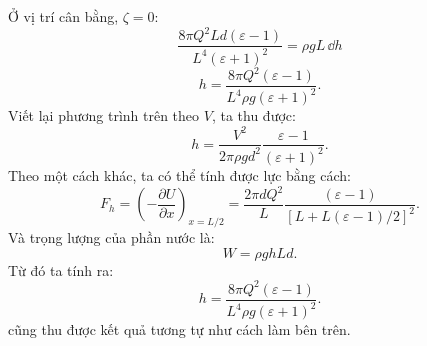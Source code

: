 \begin{loigiai}
\begin{enumerate}[1)]
    Ở vị trí cân bằng, $\zeta = 0$:
        $$\dfrac{8\pi Q^2Ld(\varepsilon-1)}{L^4(\varepsilon+1)^2} = \rho gL\,\dd h$$
    $$h = \dfrac{8\pi Q^2(\varepsilon-1)}{L^4\rho g(\varepsilon+1)^2}.$$
Viết lại phương trình trên theo $V$, ta thu được:
    $$h=\frac{V^2}{2\pi\rho g d^2}\frac{\varepsilon -1}{(\varepsilon+1)^2}.$$
    Theo một cách khác, ta có thể tính được lực bằng cách:
      $$F_h = \left(-\dfrac{\partial U}{\partial x}\right)_{x=L/2} = \dfrac{2\pi dQ^2}{L} \dfrac{(\varepsilon-1)}{[L+L(\varepsilon-1)/2]^2}.$$  
      Và trọng lượng của phần nước là:
        $$W = \rho ghLd.$$
         Từ đó ta tính ra:
         $$h = \dfrac{8\pi Q^2(\varepsilon-1)}{L^4\rho g(\varepsilon+1)^2}.$$
      cũng thu được kết quả tương tự như cách làm bên trên. 
\end{enumerate}
\end{loigiai}


